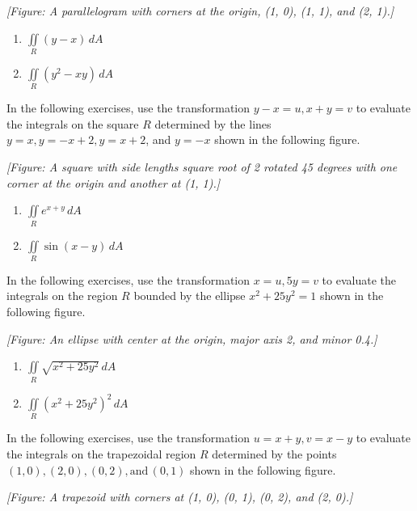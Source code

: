 \documentclass{exercises}
\begin{document}
\textit{[Figure: A parallelogram with corners at the origin, (1, 0), (1, 1), and (2, 1).]}

\begin{enumerate}[resume]
\item $\underset{R}{\iint}(y-x)\,dA$
\item $\underset{R}{\iint}(y^{2}-xy)\,dA$
\end{enumerate}

In the following exercises, use the transformation $y-x=u,x+y=v$ to evaluate the integrals on the square $R$ determined by the lines $y=x,y=-x+2,y=x+2$, and $y=-x$ shown in the following figure.


\textit{[Figure: A square with side lengths square root of 2 rotated 45 degrees with one corner at the origin and another at (1, 1).]}

\begin{enumerate}[resume]
\item $\underset{R}{\iint}e^{x+y}\,dA$
\item $\underset{R}{\iint}\sin(x-y)\,dA$
\end{enumerate}

In the following exercises, use the transformation $x=u,5y=v$ to evaluate the integrals on the region $R$ bounded by the ellipse $x^{2}+25y^{2}=1$ shown in the following figure.


\textit{[Figure: An ellipse with center at the origin, major axis 2, and minor 0.4.]}

\begin{enumerate}[resume]
\item $\underset{R}{\iint}\sqrt{x^{2}+25y^{2}}\,dA$
\item $\underset{R}{\iint}{(x^{2}+25y^{2})}^{2}\,dA$
\end{enumerate}

In the following exercises, use the transformation $u=x+y,v=x-y$ to evaluate the integrals on the trapezoidal region $R$ determined by the points $(1,0),(2,0),(0,2),\text{and}\,(0,1)$ shown in the following figure.


\textit{[Figure: A trapezoid with corners at (1, 0), (0, 1), (0, 2), and (2, 0).]}
\end{document}
